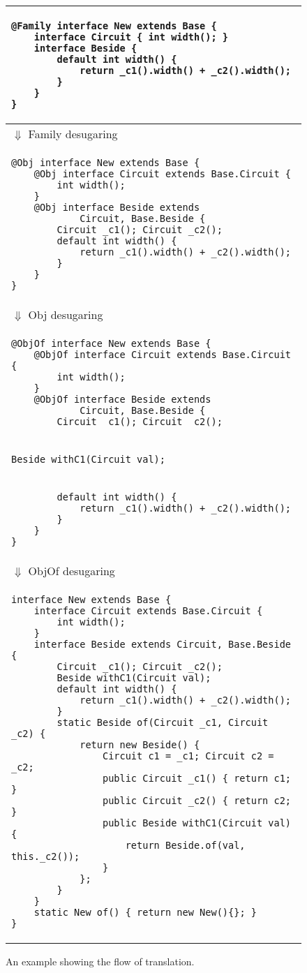\begin{figure}
\begin{tabular}{|l|}
\hline
\begin{lstlisting}
@Family interface New extends Base {
	interface Circuit { int width(); }
	interface Beside {
		default int width() {
			return _c1().width() + _c2().width();
		}
	}
}
\end{lstlisting} \\
\hline
$\Downarrow$ Family desugaring \\
\hline
\begin{lstlisting}
@Obj interface New extends Base {
	@Obj interface Circuit extends Base.Circuit {
		int width();
	}
	@Obj interface Beside extends
			Circuit, Base.Beside {
		Circuit _c1(); Circuit _c2();
		default int width() {
			return _c1().width() + _c2().width();
		}
	}
}
\end{lstlisting} \\
\hline
$\Downarrow$ Obj desugaring \\
\hline
\begin{lstlisting}
@ObjOf interface New extends Base {
	@ObjOf interface Circuit extends Base.Circuit {
		int width();
	}
	@ObjOf interface Beside extends
			Circuit, Base.Beside {
		Circuit _c1(); Circuit _c2();
\end{lstlisting}\vspace{-.05in}\\ \begin{lstlisting}[basicstyle=\ttfamily\small\color{red}]
		Beside withC1(Circuit val);
\end{lstlisting}\\ \begin{lstlisting}
		default int width() {
			return _c1().width() + _c2().width();
		}
	}
}
\end{lstlisting} \\
\hline
$\Downarrow$ ObjOf desugaring \\
\hline
\begin{lstlisting}
interface New extends Base {
	interface Circuit extends Base.Circuit {
		int width();
	}
	interface Beside extends Circuit, Base.Beside {
		Circuit _c1(); Circuit _c2();
		Beside withC1(Circuit val);
		default int width() {
			return _c1().width() + _c2().width();
		}
		static Beside of(Circuit _c1, Circuit _c2) {
			return new Beside() {
				Circuit c1 = _c1; Circuit c2 = _c2;
				public Circuit _c1() { return c1; }
				public Circuit _c2() { return c2; }
				public Beside withC1(Circuit val) {
					return Beside.of(val, this._c2());
				}
			};
		}
	}
	static New of() { return new New(){}; }
}
\end{lstlisting} \\
\hline
\end{tabular}
\caption{An example showing the flow of translation.}\label{fig:flow}
\end{figure}

